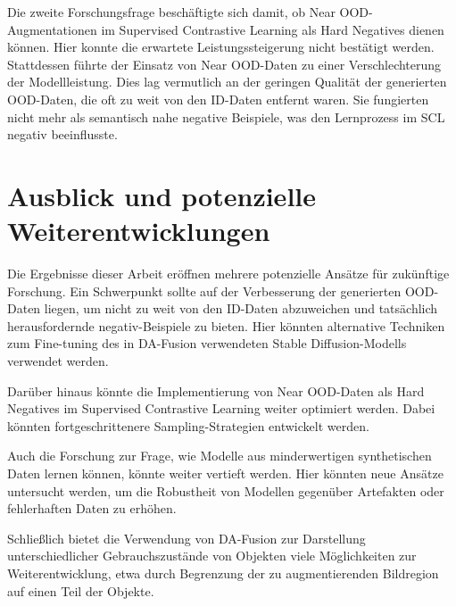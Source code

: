 Die zweite Forschungsfrage beschäftigte sich damit, ob Near OOD-Augmentationen im Supervised Contrastive Learning als Hard Negatives dienen können. Hier konnte die erwartete Leistungssteigerung nicht bestätigt werden. Stattdessen führte der Einsatz von Near OOD-Daten zu einer Verschlechterung der Modellleistung. Dies lag vermutlich an der geringen Qualität der generierten OOD-Daten, die oft zu weit von den ID-Daten entfernt waren. Sie fungierten nicht mehr als semantisch nahe negative Beispiele, was den Lernprozess im SCL negativ beeinflusste.

\section{Ausblick und potenzielle Weiterentwicklungen} \label{sec:outlook}

Die Ergebnisse dieser Arbeit eröffnen mehrere potenzielle Ansätze für zukünftige Forschung. Ein Schwerpunkt sollte auf der Verbesserung der generierten OOD-Daten liegen, um nicht zu weit von den ID-Daten abzuweichen und tatsächlich herausfordernde negativ-Beispiele zu bieten. Hier könnten alternative Techniken zum Fine-tuning des in DA-Fusion verwendeten Stable Diffusion-Modells verwendet werden.

Darüber hinaus könnte die Implementierung von Near OOD-Daten als Hard Negatives im Supervised Contrastive Learning weiter optimiert werden. Dabei könnten fortgeschrittenere Sampling-Strategien entwickelt werden.

Auch die Forschung zur Frage, wie Modelle aus minderwertigen synthetischen Daten lernen können, könnte weiter vertieft werden. Hier könnten neue Ansätze untersucht werden, um die Robustheit von Modellen gegenüber Artefakten oder fehlerhaften Daten zu erhöhen.

Schließlich bietet die Verwendung von DA-Fusion zur Darstellung unterschiedlicher Gebrauchszustände von Objekten viele Möglichkeiten zur Weiterentwicklung, etwa durch Begrenzung der zu augmentierenden Bildregion auf einen Teil der Objekte.